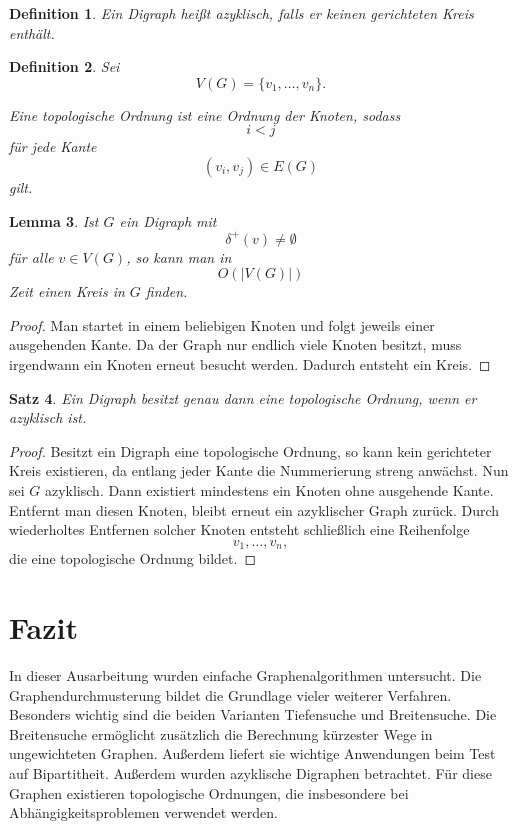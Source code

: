 \documentclass[12pt]{article}
\newtheorem{satz}{Satz}[section]
\newtheorem{definition}[satz]{Definition}
\newtheorem{lemma}[satz]{Lemma}
\begin{document}
\begin{definition}
Ein Digraph heißt azyklisch, falls er keinen gerichteten Kreis enthält.
\end{definition}

\begin{definition}
Sei
\[
V(G)=\{v_1,\dots,v_n\}.
\]

Eine topologische Ordnung ist eine Ordnung der Knoten, sodass
\[
i<j
\]
für jede Kante
\[
(v_i,v_j)\in E(G)
\]
gilt.
\end{definition}

\begin{lemma}
Ist \(G\) ein Digraph mit
\[
\delta^+(v)\neq \emptyset
\]
für alle \(v\in V(G)\), so kann man in
\[
O(|V(G)|)
\]
Zeit einen Kreis in \(G\) finden.
\end{lemma}

\begin{proof}
Man startet in einem beliebigen Knoten und folgt jeweils einer ausgehenden Kante. Da der Graph nur endlich viele Knoten besitzt, muss irgendwann ein Knoten erneut besucht werden. Dadurch entsteht ein Kreis.
\end{proof}

\begin{satz}
Ein Digraph besitzt genau dann eine topologische Ordnung, wenn er azyklisch ist.
\end{satz}

\begin{proof}
Besitzt ein Digraph eine topologische Ordnung, so kann kein gerichteter Kreis existieren, da entlang jeder Kante die Nummerierung streng anwächst. Nun sei \(G\) azyklisch. Dann existiert mindestens ein Knoten ohne ausgehende Kante. Entfernt man diesen Knoten, bleibt erneut ein azyklischer Graph zurück. Durch wiederholtes Entfernen solcher Knoten entsteht schließlich eine Reihenfolge
\[
v_1,\dots,v_n,
\]
die eine topologische Ordnung bildet.
\end{proof}

\section{Fazit}

In dieser Ausarbeitung wurden einfache Graphenalgorithmen untersucht. Die Graphendurchmusterung bildet die Grundlage vieler weiterer Verfahren. Besonders wichtig sind die beiden Varianten Tiefensuche und Breitensuche. Die Breitensuche ermöglicht zusätzlich die Berechnung kürzester Wege in ungewichteten Graphen. Außerdem liefert sie wichtige Anwendungen beim Test auf Bipartitheit. Außerdem wurden azyklische Digraphen betrachtet. Für diese Graphen existieren topologische Ordnungen, die insbesondere bei Abhängigkeitsproblemen verwendet werden.

\newpage
\printbibliography[heading=bibintoc]
\end{document}
